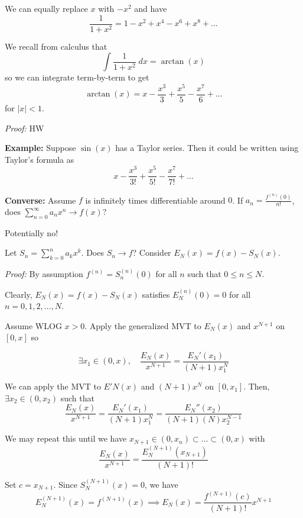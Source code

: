 \documentclass[12pt]{report}
\newcommand{\abs}[1]{\left\vert #1 \right\vert}
\newenvironment*{tbox}[2][gray]{
    \begin{tcolorbox}[
        parbox=false,
        colback=#1!5!white,
        colframe=#1!75!black,
        breakable,
        title={#2}
    ]}
    {\end{tcolorbox}}
\begin{document}
        We can equally replace $x$ with $-x^2$ and have 
        \[\frac{1}{1 + x^2} = 1 - x^2 + x^4 - x^6 + x^8 + \dots\]

        We recall from calculus that 
        \[\int \frac{1}{1 + x^2}\; dx = \arctan(x)\]
        so we can integrate term-by-term to get 
        \[\arctan(x) = x - \frac{x^3}{3} + \frac{x^5}{5} - \frac{x^7}{6} + \dots\]
        for $\abs{x} < 1$.

        \begin{tbox}{\textbf{Taylor's Formula:} Let 
            \[f(x) = a_0 + a_1 x + a_2 x^2 + \dots\]
            be defined on some nontrivial interval centered at $0$. Then 
            \[a_n = \frac{f^{n}(0)}{n!}\]}
            \emph{Proof:} HW
        \end{tbox}

        \textbf{Example:} Suppose $\sin(x)$ has a Taylor series. Then it could be written using Taylor's formula as 
        \[x - \frac{x^3}{3!} + \frac{x^5}{5!} - \frac{x^7}{7!} + \dots\]

        \textbf{Converse:} Assume $f$ is infinitely times differentiable around $0$. If $a_n = \frac{f^(n)(0)}{n!}$, does $\sum_{n=0}^\infty a_n x^n \to f(x)$?

        Potentially no! 

        Let $S_n = \sum_{k=0}^n a_k x^k$. Does $S_n \to f$? Consider $E_N(x) = f(x) - S_N(x)$. 

        \begin{tbox}{\textbf{Lagrange's Remainder Theorem:} Let $f$ be $N+1$ times differentiable on $(-R, R)$. Define 
            \[a_n = \frac{f^{(n)}(0)}{n!} \quad n = 0, 1, 2, \dots\] 
            and let $S_N(x) = a_0 + a_1x + \dots + a_N x^N$. Given $x \neq 0$ in $(-R, R)$, $\exists c$ such that $\abs{c} < \abs{x}$ where the error function $E_N(x)$ satisfies 
            \[E_N(x) = \frac{f^{(N+1)}(c)}{(N+1)!} x^{n+1}\]}
        
            \emph{Proof:} By assumption $f^{(n)} = S_n^{(n)}(0)$ for all $n$ such that $0 \leq n \leq N$. 

            Clearly, $E_N(x) = f(x) - S_N(x)$ satisfies $E_N^{(n)}(0) = 0$ for all $n = 0, 1, 2, \dots, N$.

            Assume WLOG $x > 0$. Apply the generalized MVT to $E_N(x)$ and $x^{N+1}$ on $[0, x]$ so

            \[\exists x_1 \in (0, x), \quad \frac{E_N(x)}{x^{N+1}} = \frac{E_N'(x_1)}{(N+1)x_1^N}\]

            We can apply the MVT to $E'N(x)$ and $(N+1)x^N$ on $[0, x_1]$. Then, $\exists x_2 \in (0, x_2)$ such that 
            \[\frac{E_N(x)}{x^{N+1}} = \frac{E_N'(x_1)}{(N+1)x_1^N} = \frac{E_N''(x_2)}{(N+1)(N)x_2^{N-1}}\]

            We may repeat this until we have $x_{N+1} \in (0, x_n) \subset \dots \subset (0, x)$ with 
            \[\frac{E_N(x)}{x^{N+1}} = \frac{E_N^{(N+1)}(x_{N+1})}{(N+1)!}\]

            Set $c = x_{N+1}$. Since $S_N^{(N+1)}(x) = 0$, we have 
            \[E_N^{(N+1)}(x) = f^{(N+1)}(x) \implies E_N(x) = \frac{f^{(N+1)}(c)}{(N+1)!}x^{N+1}\]
        \end{tbox}
\end{document}

